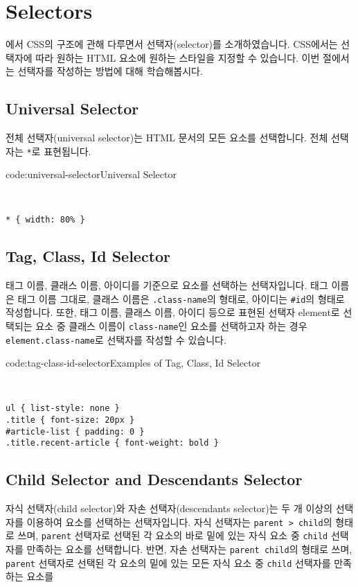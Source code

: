 \section{Selectors} \label{sect:selectors}

에서 CSS의 구조에 관해 다루면서 선택자(selector)를 소개하였습니다. CSS에서는 선택자에 따라 원하는 HTML 요소에 원하는 스타일을 지정할 수 있습니다. 이번 절에서는 선택자를 작성하는 방법에 대해 학습해봅시다. 

\subsection*{Universal Selector}

전체 선택자(universal selector)는 HTML 문서의 모든 요소를 선택합니다. 전체 선택자는 \verb|*|로 표현됩니다. 

\begin{codeenv}{code:universal-selector}{Universal Selector}\begin{verbatim}


* { width: 80% }
\end{verbatim}
\end{codeenv}

\subsection*{Tag, Class, Id Selector}
태그 이름, 클래스 이름, 아이디를 기준으로 요소를 선택하는 선택자입니다. 태그 이름은 태그 이름 그대로, 클래스 이름은 \verb|.class-name|의 형태로, 아이디는 \verb|#id|의 형태로 작성합니다. 또한, 태그 이름, 클래스 이름, 아이디 등으로 표현된 선택자 element로 선택되는 요소 중 클래스 이름이 \verb|class-name|인 요소를 선택하고자 하는 경우 \verb|element.class-name|로 선택자를 작성할 수 있습니다.

\begin{codeenv}{code:tag-class-id-selector}{Examples of Tag, Class, Id Selector}\begin{verbatim}


ul { list-style: none }
.title { font-size: 20px }
#article-list { padding: 0 }
.title.recent-article { font-weight: bold }
\end{verbatim}
\end{codeenv}

\subsection*{Child Selector and Descendants Selector}
자식 선택자(child selector)와 자손 선택자(descendants selector)는 두 개 이상의 선택자를 이용하여 요소를 선택하는 선택자입니다. 자식 선택자는 \verb|parent > child|의 형태로 쓰며, \verb|parent| 선택자로 선택된 각 요소의 바로 밑에 있는 자식 요소 중 \verb|child| 선택자를 만족하는 요소를 선택합니다. 반면, 자손 선택자는 \verb|parent child|의 형태로 쓰며, \verb|parent| 선택자로 선택된 각 요소의 밑에 있는 모든 자식 요소 중 \verb|child| 선택자를 만족하는 요소를 

